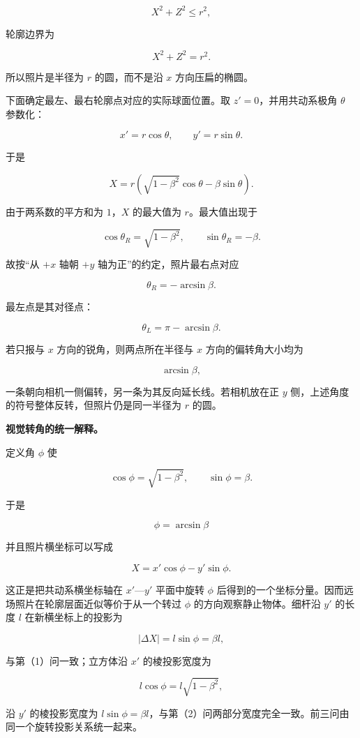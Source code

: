 \documentclass[12pt,a4paper,UTF8]{ctexart}
\begin{document}
\[X^2+Z^2\le r^2,\]

轮廓边界为

\[\boxed{X^2+Z^2=r^2}.\]

所以照片是半径为 \(r\) 的圆，而不是沿 \(x\) 方向压扁的椭圆。

下面确定最左、最右轮廓点对应的实际球面位置。取 \(z'=0\)，并用共动系极角
\(\theta\) 参数化：

\[x'=r\cos\theta,\qquad y'=r\sin\theta.\]

于是

\[X=r\left(\sqrt{1-\beta^2}\cos\theta-\beta\sin\theta\right).\]

由于两系数的平方和为 \(1\)，\(X\) 的最大值为 \(r\)。最大值出现于

\[\cos\theta_R=\sqrt{1-\beta^2},\qquad \sin\theta_R=-\beta.\]

故按``从 \(+x\) 轴朝 \(+y\) 轴为正''的约定，照片最右点对应

\[\boxed{\theta_R=-\arcsin\beta}.\]

最左点是其对径点：

\[\boxed{\theta_L=\pi-\arcsin\beta}.\]

若只报与 \(x\) 方向的锐角，则两点所在半径与 \(x\) 方向的偏转角大小均为

\[\boxed{\arcsin\beta},\]

一条朝向相机一侧偏转，另一条为其反向延长线。若相机放在正 \(y\)
侧，上述角度的符号整体反转，但照片仍是同一半径为 \(r\) 的圆。

\textbf{视觉转角的统一解释。}

定义角 \(\phi\) 使

\[\cos\phi=\sqrt{1-\beta^2},\qquad \sin\phi=\beta.\]

于是

\[\phi=\arcsin\beta\]

并且照片横坐标可以写成

\[X=x'\cos\phi-y'\sin\phi.\]

这正是把共动系横坐标轴在 \(x'\)---\(y'\) 平面中旋转 \(\phi\)
后得到的一个坐标分量。因而远场照片在轮廓层面近似等价于从一个转过
\(\phi\) 的方向观察静止物体。细杆沿 \(y'\) 的长度 \(l\)
在新横坐标上的投影为

\[|\Delta X|=l\sin\phi=\beta l,\]

与第（1）问一致；立方体沿 \(x'\) 的棱投影宽度为

\[l\cos\phi=l\sqrt{1-\beta^2},\]

沿 \(y'\) 的棱投影宽度为
\(l\sin\phi=\beta l\)，与第（2）问两部分宽度完全一致。前三问由同一个旋转投影关系统一起来。
\end{document}

